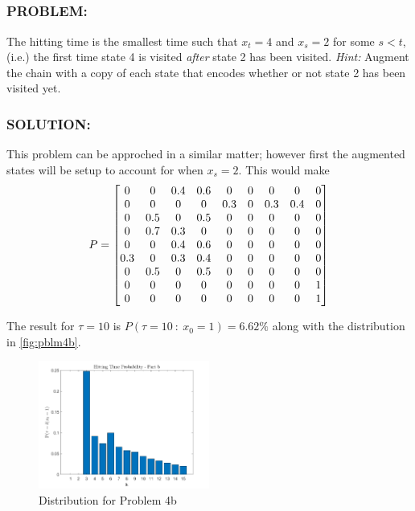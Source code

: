\documentclass[]{article}
\newcommand{\Problem}{\subsubsection*{\textbf{PROBLEM:}}}
\newcommand{\Solution}{\subsubsection*{\textbf{SOLUTION:}}}
\newcommand{\st}{\ : \ }
\begin{document}
\subsection{}
\Problem
The hitting time is the smallest time such that $x_t = 4$ and $x_s = 2$ for some $s < t$, (i.e.) the first time state 4 is visited \emph{after} state 2 has been visited.
\emph{Hint:} Augment the chain with a copy of each state that encodes whether or not state 2 has been visited yet.
\Solution
This problem can be approched in a similar matter; however first the augmented states will be setup to account for when $x_s = 2$.
This would make \[
    P = \mqty[
        0   & 0   & 0.4 & 0.6 & 0   & 0 & 0   & 0   & 0 \\
        0   & 0   & 0   & 0   & 0.3 & 0 & 0.3 & 0.4 & 0 \\
        0   & 0.5 & 0   & 0.5 & 0   & 0 & 0   & 0   & 0 \\
        0   & 0.7 & 0.3 & 0   & 0   & 0 & 0   & 0   & 0 \\
        0   & 0   & 0.4 & 0.6 & 0   & 0 & 0   & 0   & 0 \\
        0.3 & 0   & 0.3 & 0.4 & 0   & 0 & 0   & 0   & 0 \\
        0   & 0.5 & 0   & 0.5 & 0   & 0 & 0   & 0   & 0 \\
        0   & 0   & 0   & 0   & 0   & 0 & 0   & 0   & 1 \\
        0   & 0   & 0   & 0   & 0   & 0 & 0   & 0   & 1
    ]
\]

The result for $\tau = 10$ is $P(\tau = 10 \st x_0 = 1) = 6.62\%$
along with the distribution in \autoref{fig:pblm4b}.
\begin{figure}[h]
    \centering
    \includegraphics[width = 0.5\textwidth]{figs/pblm4b.png}
    \caption{Distribution for Problem 4b}
    \label{fig:pblm4b}
\end{figure}



\newpage

\newpage


% 
% 
\end{document}

